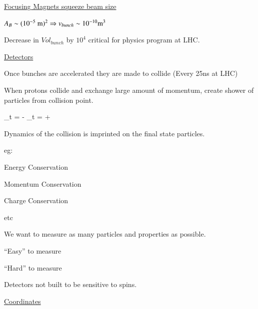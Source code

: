 {\underline{Focusing Magnets squeeze beam size}

$A_B \sim (10^{-5}\ \textrm{m})^2 \Rightarrow v_{bunch} \sim 10^{-10} \textrm{m}^3$

Decrease in $Vol_{bunch}$ by $10^4$ critical for physics program at LHC.

\lineacross

\underline{Detectors}

Once bunches are accelerated they are made to collide (Every 25ns at LHC)

When protons collide and exchange large amount of momentum, create shower of particles from collision point.

\be
{}_{t = -\infty} \rightarrow {}_{t = +\infty}
\ee

Dynamics of the collision is imprinted on the final state particles.

eg:
\bi
\item[-] Energy Conservation
\item[-] Momentum Conservation
\item[-] Charge Conservation 
\item[-] etc
\ei

We want to measure as many particles and properties as possible.

``Easy'' to measure 

``Hard'' to measure 

Detectors not built to be sensitive to spins.


\underline{Coordinates}

}
